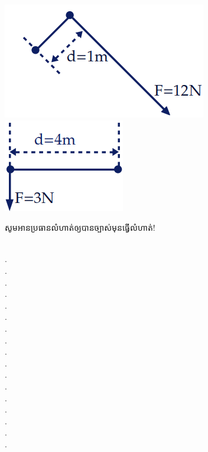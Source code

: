 \documentclass{officialexam}
\begin{document}
\begin{enumerate}[I]
\begin{enumerate}[m]
\begin{multicols}{2}
				\includegraphics[scale=0.4]{11}
				\includegraphics[scale=0.4]{12}
			\end{multicols}
		\end{enumerate}
	\begin{center}
		\sffamily\color{blue}
		សូមអានប្រធានលំហាត់ឲ្យបានច្បាស់មុនធ្វើលំហាត់!
	\end{center}
	\end{enumerate}
	\\
	{\color{white}.}\dotfill
	\\
	{\color{white}.}\dotfill\\
	{\color{white}.}\dotfill\\
	{\color{white}.}\dotfill
	\\
	{\color{white}.}\dotfill\\
	{\color{white}.}\dotfill\\
	{\color{white}.}\dotfill
	\\
	{\color{white}.}\dotfill\\
	{\color{white}.}\dotfill\\
	{\color{white}.}\dotfill
	\\
	{\color{white}.}\dotfill\\
	{\color{white}.}\dotfill\\
	{\color{white}.}\dotfill
	\\
	{\color{white}.}\dotfill\\
	{\color{white}.}\dotfill\\
	{\color{white}.}\dotfill
	\\
	{\color{white}.}\dotfill\\
\end{document}
